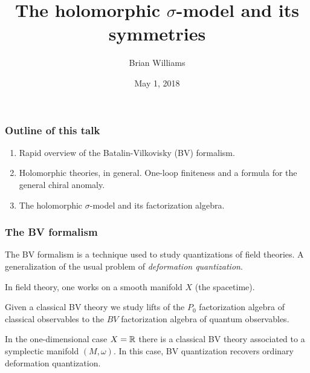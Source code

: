\documentclass[10pt]{beamer}
\title{The holomorphic $\sigma$-model and its symmetries}
\author{Brian Williams}
\institute{Northwestern University \\ Advisors: John Francis and Kevin Costello}
\date{May 1, 2018}
\begin{document}
\frame{\titlepage}

\begin{frame}
\frametitle{Outline of this talk}
\begin{enumerate}
\item Rapid overview of the Batalin-Vilkovisky (BV) formalism.
\item Holomorphic theories, in general. 
One-loop finiteness and a formula for the general chiral anomaly. 
\item The holomorphic $\sigma$-model and its factorization algebra.
\end{enumerate}
\end{frame}

\begin{frame}[fragile]
\frametitle{The BV formalism}
The BV formalism is a technique used to study quantizations of field theories.
A generalization of the usual problem of {\em deformation quantization}.
\ben
{}
\een

In field theory, one works on a smooth manifold $X$ (the spacetime). 
\ben
{}
\een
Given a classical BV theory we study lifts of the $P_0$ factorization algebra of classical observables to the $BV$ factorization algebra of quantum observables.

In the one-dimensional case $X = \mathbb R$ there is a classical BV theory associated to a symplectic manifold $(M, \omega)$. 
In this case, BV quantization recovers ordinary deformation quantization. 
\end{frame}

%
\end{document}
